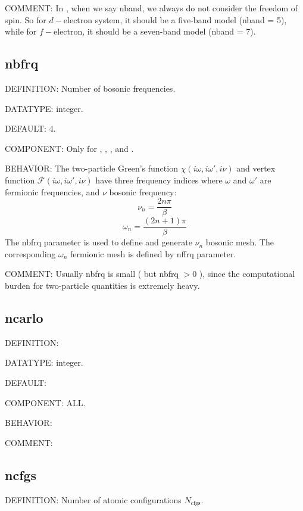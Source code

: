 {\color{olive}COMMENT:} In {\iqist}, when we say nband, we always do not consider the freedom of spin. So for $d-$electron system, it should be a five-band model (nband = 5), while for $f-$electron, it should be a seven-band model (nband = 7).

\subsection{nbfrq}
{\color{red}DEFINITION:} Number of bosonic frequencies.
 
{\color{green}DATATYPE:} integer.

{\color{blue}DEFAULT:} 4.

{\color{brown}COMPONENT:} Only for {\gardenia}, {\narcissus}, {\lavender}, and {\manjushaka}.

{\color{purple}BEHAVIOR:} The two-particle Green's function $\chi(i\omega,i\omega',i\nu)$ and vertex function $\mathcal{F}(i\omega,i\omega',i\nu)$ have three frequency indices where $\omega$ and $\omega'$ are fermionic frequencies, and $\nu$ bosonic frequency:
\begin{equation}
\nu_n = \frac{2n\pi}{\beta}
\end{equation}
\begin{equation}
\omega_n = \frac{(2n + 1)\pi}{\beta}
\end{equation}
The nbfrq parameter is used to define and generate $\nu_n$ bosonic mesh. The corresponding $\omega_n$ fermionic mesh is defined by nffrq parameter.

{\color{olive}COMMENT:} Usually nbfrq is small ( but nbfrq $> 0$ ), since the computational burden for two-particle quantities is extremely heavy.

\subsection{ncarlo}
{\color{red}DEFINITION:}

{\color{green}DATATYPE:} integer.

{\color{blue}DEFAULT:}

{\color{brown}COMPONENT:} ALL.

{\color{purple}BEHAVIOR:}

{\color{olive}COMMENT:}

\subsection{ncfgs}
{\color{red}DEFINITION:} Number of atomic configurations $N_{\text{cfgs}}$.

